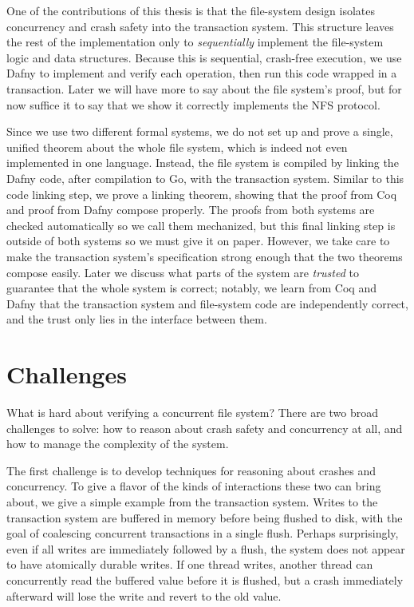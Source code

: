 One of the contributions of this thesis is that the file-system design isolates
concurrency and crash safety into the transaction system. This structure leaves
the rest of the implementation only to \emph{sequentially} implement the
file-system logic and data structures. Because this is sequential, crash-free
execution, we use Dafny to implement and verify each operation, then run this
code wrapped in a transaction. Later we will have more to say about the file
system's proof, but for now suffice it to say that we show it correctly
implements the NFS protocol.

Since we use two different formal systems, we do not set up and prove a single,
unified theorem about the whole file system, which is indeed not even
implemented in one language. Instead, the file system is compiled by linking the
Dafny code, after compilation to Go, with the transaction system. Similar to
this code linking step, we prove a linking theorem, showing that the proof from
Coq and proof from Dafny compose properly. The proofs from both systems are
checked automatically so we call them mechanized, but this final linking step is
outside of both systems so we must give it on paper. However, we take care to
make the transaction system's specification strong enough that the two theorems
compose easily. Later we discuss what parts of the system are \emph{trusted} to
guarantee that the whole system is correct; notably, we learn from Coq and Dafny
that the transaction system and file-system code are independently correct, and
the trust only lies in the interface between them.

\section{Challenges}

What is hard about verifying a concurrent file system? There are two broad
challenges to solve: how to reason about crash safety and concurrency at all,
and how to manage the complexity of the system.

The first challenge is to develop techniques for reasoning about crashes and
concurrency. To give a flavor of the kinds of interactions these two can bring
about, we give a simple example from the transaction system. Writes to the
transaction system are buffered in memory before being flushed to disk, with the
goal of coalescing concurrent transactions in a single flush. Perhaps
surprisingly, even if all writes are immediately followed by a flush, the system
does not appear to have atomically durable writes. If one thread writes, another
thread can concurrently read the buffered value before it is flushed, but a
crash immediately afterward will lose the write and revert to the old value.

